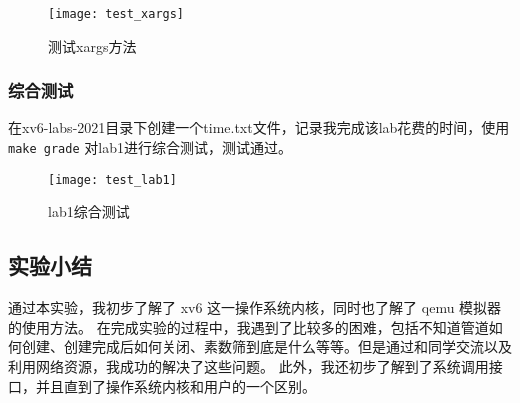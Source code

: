 \begin{figure}[!htb]
	\centering
	\texttt{[image: test\_xargs]}
	\caption{测试xargs方法}
	\label{fig:test_xargs}
\end{figure}

\subsubsection{综合测试}

在xv6-labs-2021目录下创建一个time.txt文件，记录我完成该lab花费的时间，使用 \texttt{make grade} 对lab1进行综合测试，测试通过。

\begin{figure}[!htb]
	\centering
	\texttt{[image: test\_lab1]}
	\caption{lab1综合测试}
	\label{fig:test_lab1}
\end{figure}

\subsection{实验小结}

通过本实验，我初步了解了 xv6 这一操作系统内核，同时也了解了 qemu 模拟器的使用方法。
在完成实验的过程中，我遇到了比较多的困难，包括不知道管道如何创建、创建完成后如何关闭、素数筛到底是什么等等。但是通过和同学交流以及利用网络资源，我成功的解决了这些问题。
此外，我还初步了解到了系统调用接口，并且直到了操作系统内核和用户的一个区别。




